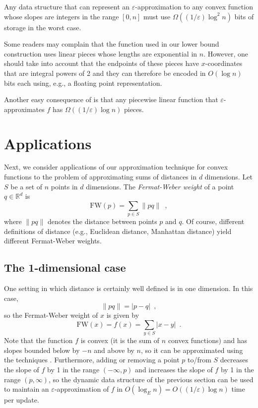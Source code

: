 \documentclass[charterfonts,lotsofwhite]{patmorin}
\newcommand{\fw}{\mathrm{FW}}
\newcommand{\eps}{\varepsilon}
\newcommand{\Real}{\mathbb{R}}
\begin{document}
\begin{thm}
Any data structure that can represent an $\eps$-approximation to any
convex function whose slopes are integers in the range $[0,n]$ must
use $\Omega((1/\eps)\log^2 n)$ bits of storage in the worst
case.
\end{thm}

\begin{rem}
Some readers may complain that the function used in our lower bound
construction uses linear pieces whose lengths are exponential in $n$.
However, one should take into account that the endpoints of these
pieces have $x$-coordinates that are integral powers of 2 and they can
therefore be encoded in $O(\log n)$ bits each using, e.g., a floating
point representation.
\end{rem}

\begin{rem}
Another easy consequence of  is that any piecewise
linear function that $\eps$-approximates $f$ has $\Omega((1/\eps) \log
n)$ pieces.
\end{rem}

\section{Applications}

Next, we consider applications of our approximation technique for
convex functions to the problem of approximating sums of distances in
$d$ dimensions.  Let $S$ be a set of $n$ points in $d$ dimensions.
The \emph{Fermat-Weber weight} of a point $q\in\Real^d$ is
\[
   \fw(p) = \sum_{p\in S} \|pq\| \enspace ,
\]
where $\|pq\|$ denotes the distance between points $p$ and $q$. Of
course, different definitions of distance (e.g., Euclidean distance,
Manhattan distance) yield different Fermat-Weber weights.

\subsection{The 1-dimensional case}

One setting in which distance is certainly well defined is in one
dimension.  In this case,
\[ 
\|pq\| = |p-q| \enspace ,
\]
so the Fermat-Weber weight of $x$ is given by
\[
   \fw(x) = f(x) = \sum_{y\in S} |x-y|  \enspace .
\]
Note that the function $f$ is convex (it is the sum of $n$ convex
functions) and has slopes bounded below by $-n$ and above by $n$, so
it can be approximated using the techniques .  Furthermore,
adding or removing a point $p$ to/from $S$ decreases the slope of $f$
by 1 in the range $(-\infty,p)$ and increases the slope of $f$ by 1 in
the range $(p,\infty)$, so the dynamic data structure of the previous
section can be used to maintain an $\eps$-approximation of $f$ in
$O(\log_E n)= O((1/\eps) \log n)$ time per update.
\end{document}
